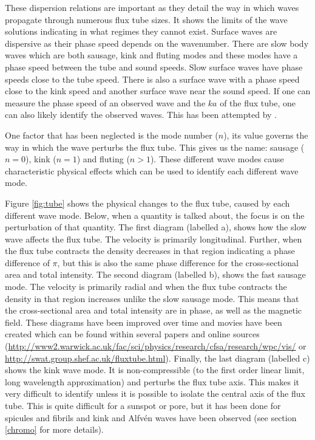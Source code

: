     These dispersion relations are important as they detail the way in which waves propagate through numerous flux tube sizes.
    It shows the limits of the wave solutions indicating in what regimes they cannot exist.
    Surface waves are dispersive as their phase speed depends on the wavenumber.
    There are slow body waves which are both sausage, kink and fluting modes and these modes have a phase speed between the tube and sound speeds.
    Slow surface waves have phase speeds close to the tube speed. 
    There is also a surface wave with a phase speed close to the kink speed and another surface wave near the sound speed.
    If one can measure the phase speed of an observed wave and the $ka$ of the flux tube, one can also likely identify the observed waves.
    This has been attempted by \cite{2015A&A...579A..73M}.
    
    One factor that has been neglected is the mode number ($n$), its value governs the way in which the wave perturbs the flux tube.
    This gives us the name: sausage ($n=0$), kink ($n=1$) and fluting ($n>1$).
    These different wave modes cause characteristic physical effects which can be used to identify each different wave mode.
    
    Figure \ref{fig:tube} shows the physical changes to the flux tube, caused by each different wave mode.
    Below, when a quantity is talked about, the focus is on the perturbation of that quantity.
    The first diagram (labelled a), shows how the slow wave affects the flux tube. 
    The velocity is primarily longitudinal.
    Further, when the flux tube contracts the density decreases in that region indicating a phase difference of $\pi$, but this is also the same phase difference for the cross-sectional area and total intensity.
    The second diagram (labelled b), shows the fast sausage mode.
    The velocity is primarily radial and when the flux tube contracts the density in that region increases unlike the slow sausage mode.
    This means that the cross-sectional area and total intensity are in phase, as well as the magnetic field.
    These diagrams have been improved over time and movies have been created which can be found within several papers \citep{Morton2012,jess2015multiwavelength} and online sources (\url{http://www2.warwick.ac.uk/fac/sci/physics/research/cfsa/research/wpc/vis/} or \url{http://swat.group.shef.ac.uk/fluxtube.html}).
    Finally, the last diagram (labelled c) shows the kink wave mode.
    It is non-compressible (to the first order linear limit, long wavelength approximation) and perturbs the flux tube axis.
    This makes it very difficult to identify unless it is possible to isolate the central axis of the flux tube.
    This is quite difficult for a sunspot or pore, but it has been done for spicules and fibrils and  kink and Alfv\'en waves have been observed (see section \ref{chromo} for more details).
    

